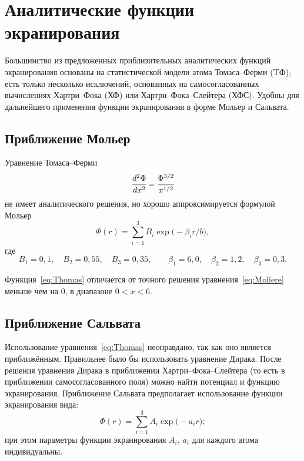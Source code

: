 \documentclass[10pt,pscyr]{hedlab}
\date{10.04.2014}
\newcommand{\eq}  [1]{\eqref{eq:#1}}
\begin{document}
  \makeheader
  
  \section{Аналитические функции экранирования}

  Большинство из предложенных приблизительных аналитических
  функций экранирования основаны на статистической модели
  атома Томаса--Ферми (TФ); есть только несколько исключений,
  основанных на самосогласованных вычислениях Хартри--Фока (ХФ)
  или Хартри--Фока--Слейтера (ХФС). Удобны для дальнейшего
  применения функции экранирования в форме Мольер и Сальвата.
  
  \subsection{Приближение Мольер}

  Уравнение Томаса--Ферми
  \begin{equation}
    \cfrac{d^2\Phi}{dx^2} = \cfrac{\Phi^{3/2}}{x^{1/2}}
    \label{eq:Thomas}
  \end{equation}
  не имеет аналитического  решения, но хорошо аппроксимируется
  формулой Мольер
  \begin{equation}
    \Phi(r)=\sum_{i=1}^3B_i\exp\bigl(-\beta_ir/b\big),
    \label{eq:Moliere}
  \end{equation}
  где
  \[
    B_1 = 0,\!1, \quad B_2 = 0,\!55, \quad B_3 = 0,\!35, \qquad
      \beta_1 = 6,\!0, \quad \beta_2 = 1,\!2, \quad \beta_3 = 0,\!3.
  \]
 
  Функция~\eq{Thomas} отличается от точного решения
  уравнения~\eq{Moliere} меньше чем на 0, в диапазоне
  \( 0 < x < 6 \).

  \subsection{Приближение Сальвата}

  Использование уравнения~\eq{Thomas} неоправдано, так как оно является
  приближённым. Правильнее было бы использовать уравнение Дирака.
  После решения уравнения Дирака в приближении Хартри--Фока--Слейтера
  (то есть в приближении самосогласованного поля) можно найти
  потенциал и функцию экранирования. Приближение Сальвата
  предполагает использование функции экранирования вида:
  \begin{equation}
    \Phi(r) = \sum_{i = 1}^3 A_i\exp\bigl(-a_ir\big);
    \label{eq:Salvat} 
  \end{equation}
  при этом параметры функции экранирования \( A_i \), \( a_i \) для каждого
  атома индивидуальны. 
\end{document}
